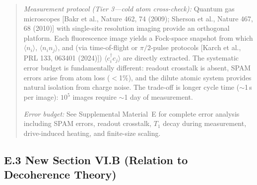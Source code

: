 \documentclass[11pt,a4paper]{article}
\begin{document}
\begin{quote}
\textit{Measurement protocol (Tier 3---cold atom cross-check):} Quantum gas microscopes [Bakr et al., Nature 462, 74 (2009); Sherson et al., Nature 467, 68 (2010)] with single-site resolution imaging provide an orthogonal platform. Each fluorescence image yields a Fock-space snapshot from which $\langle n_i \rangle$, $\langle n_i n_j \rangle$, and (via time-of-flight or $\pi/2$-pulse protocols [Karch et al., PRL 133, 063401 (2024)]) $\langle c^\dagger_i c_j \rangle$ are directly extracted. The systematic error budget is fundamentally different: readout crosstalk is absent, SPAM errors arise from atom loss ($<$1\%), and the dilute atomic system provides natural isolation from charge noise. The trade-off is longer cycle time ($\sim$1\,s per image): $10^5$ images require $\sim$1 day of measurement.

\textit{Error budget:} See Supplemental Material~E for complete error analysis including SPAM errors, readout crosstalk, $T_1$ decay during measurement, drive-induced heating, and finite-size scaling.
\end{quote}

\subsection*{E.3 New Section VI.B (Relation to Decoherence Theory)}
\end{document}
